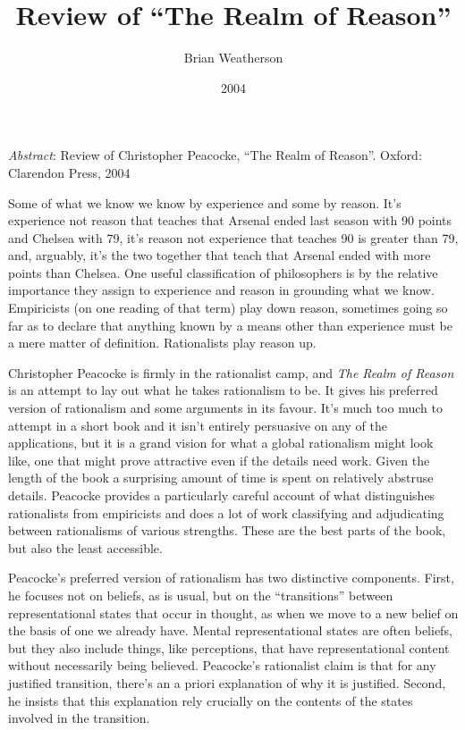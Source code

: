 \documentclass[
  11pt,
  letterpaper,
  DIV=11,
  numbers=noendperiod,
  twoside]{scrartcl}
\title{Review of ``The Realm of Reason''}
\author{Brian Weatherson}
\date{2004}
\renewenvironment{abstract}
 {\vspace{-1.25cm}
 \quotation\small\noindent\emph{Abstract}:}
 {\endquotation}
\renewenvironment{abstract}
 {\quotation\small\noindent\emph{Abstract}:}
 {\endquotation\vspace{-0.02cm}}
\begin{document}
\maketitle
\begin{abstract}
Review of Christopher Peacocke, ``The Realm of Reason''. Oxford:
Clarendon Press, 2004
\end{abstract}


Some of what we know we know by experience and some by reason. It's
experience not reason that teaches that Arsenal ended last season with
90 points and Chelsea with 79, it's reason not experience that teaches
90 is greater than 79, and, arguably, it's the two together that teach
that Arsenal ended with more points than Chelsea. One useful
classification of philosophers is by the relative importance they assign
to experience and reason in grounding what we know. Empiricists (on one
reading of that term) play down reason, sometimes going so far as to
declare that anything known by a means other than experience must be a
mere matter of definition. Rationalists play reason up.

Christopher Peacocke is firmly in the rationalist camp, and \emph{The
Realm of Reason} is an attempt to lay out what he takes rationalism to
be. It gives his preferred version of rationalism and some arguments in
its favour. It's much too much to attempt in a short book and it isn't
entirely persuasive on any of the applications, but it is a grand vision
for what a global rationalism might look like, one that might prove
attractive even if the details need work. Given the length of the book a
surprising amount of time is spent on relatively abstruse details.
Peacocke provides a particularly careful account of what distinguishes
rationalists from empiricists and does a lot of work classifying and
adjudicating between rationalisms of various strengths. These are the
best parts of the book, but also the least accessible.

Peacocke's preferred version of rationalism has two distinctive
components. First, he focuses not on beliefs, as is usual, but on the
``transitions'' between representational states that occur in thought,
as when we move to a new belief on the basis of one we already have.
Mental representational states are often beliefs, but they also include
things, like perceptions, that have representational content without
necessarily being believed. Peacocke's rationalist claim is that for any
justified transition, there's an a priori explanation of why it is
justified. Second, he insists that this explanation rely crucially on
the contents of the states involved in the transition.
\end{document}
